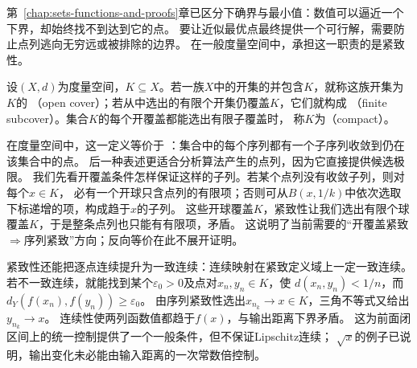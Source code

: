 第~\ref{chap:sets-functions-and-proofs}章已区分下确界与最小值：数值可以逼近一个下界，却始终找不到达到它的点。
要让近似最优点最终提供一个可行解，需要防止点列逃向无穷远或被排除的边界。
在一般度量空间中，承担这一职责的是紧致性。
\begin{definition}[开覆盖与紧致性]
\label{def:analysis-compactness}
设$(X,d)$为度量空间，$K\subseteq X$。若一族$X$中的开集的并包含$K$，就称这族开集为$K$的
（open cover）；若从中选出的有限个开集仍覆盖$K$，它们就构成
（finite subcover）。集合$K$的每个开覆盖都能选出有限子覆盖时，
称$K$为（compact）。
\end{definition}
在度量空间中，这一定义等价于
：集合中的每个序列都有一个子序列收敛到仍在该集合中的点。
后一种表述更适合分析算法产生的点列，因为它直接提供候选极限。
我们先看开覆盖条件怎样保证这样的子列。若某个点列没有收敛子列，则对每个$x\in K$，
必有一个开球只含点列的有限项；否则可从$B(x,1/k)$中依次选取下标递增的项，构成趋于$x$的子列。
这些开球覆盖$K$，紧致性让我们选出有限个球覆盖$K$，于是整条点列也只能有有限项，矛盾。
这说明了当前需要的“开覆盖紧致$\Rightarrow$序列紧致”方向；反向等价在此不展开证明。

紧致性还能把逐点连续提升为一致连续：连续映射在紧致定义域上一定一致连续。
若不一致连续，就能找到某个$\varepsilon_0>0$及点对$x_n,y_n\in K$，使
$d(x_n,y_n)<1/n$，而$d_Y(f(x_n),f(y_n))\geq\varepsilon_0$。
由序列紧致性选出$x_{n_k}\to x\in K$，三角不等式又给出$y_{n_k}\to x$。
连续性使两列函数值都趋于$f(x)$，与输出距离下界矛盾。
这为前面闭区间上的统一控制提供了一个一般条件，但不保证Lipschitz连续；
$\sqrt{x}$的例子已说明，输出变化未必能由输入距离的一次常数倍控制。


